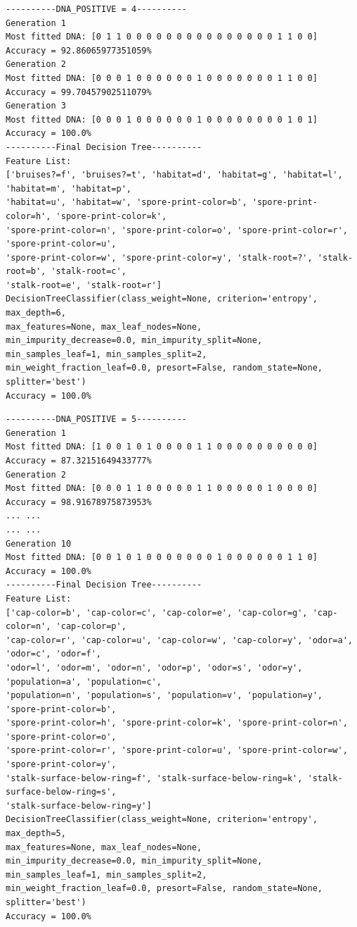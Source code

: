 \documentclass[runningheads]{llncs}
\begin{document}
\begin{verbatim}
----------DNA_POSITIVE = 4----------
Generation 1
Most fitted DNA: [0 1 1 0 0 0 0 0 0 0 0 0 0 0 0 0 0 0 1 1 0 0]
Accuracy = 92.86065977351059%
Generation 2
Most fitted DNA: [0 0 0 1 0 0 0 0 0 0 1 0 0 0 0 0 0 0 1 1 0 0]
Accuracy = 99.70457902511079%
Generation 3
Most fitted DNA: [0 0 0 1 0 0 0 0 0 0 1 0 0 0 0 0 0 0 0 1 0 1]
Accuracy = 100.0%
----------Final Decision Tree----------
Feature List:
['bruises?=f', 'bruises?=t', 'habitat=d', 'habitat=g', 'habitat=l', 'habitat=m', 'habitat=p',
'habitat=u', 'habitat=w', 'spore-print-color=b', 'spore-print-color=h', 'spore-print-color=k',
'spore-print-color=n', 'spore-print-color=o', 'spore-print-color=r', 'spore-print-color=u',
'spore-print-color=w', 'spore-print-color=y', 'stalk-root=?', 'stalk-root=b', 'stalk-root=c',
'stalk-root=e', 'stalk-root=r']
DecisionTreeClassifier(class_weight=None, criterion='entropy', max_depth=6,
max_features=None, max_leaf_nodes=None,
min_impurity_decrease=0.0, min_impurity_split=None,
min_samples_leaf=1, min_samples_split=2,
min_weight_fraction_leaf=0.0, presort=False, random_state=None,
splitter='best')
Accuracy = 100.0%
\end{verbatim}

\begin{verbatim}
----------DNA_POSITIVE = 5----------
Generation 1
Most fitted DNA: [1 0 0 1 0 1 0 0 0 0 1 1 0 0 0 0 0 0 0 0 0 0]
Accuracy = 87.32151649433777%
Generation 2
Most fitted DNA: [0 0 0 1 1 0 0 0 0 0 1 1 0 0 0 0 0 1 0 0 0 0]
Accuracy = 98.91678975873953%
... ...
... ...
Generation 10
Most fitted DNA: [0 0 1 0 1 0 0 0 0 0 0 0 1 0 0 0 0 0 0 1 1 0]
Accuracy = 100.0%
----------Final Decision Tree----------
Feature List:
['cap-color=b', 'cap-color=c', 'cap-color=e', 'cap-color=g', 'cap-color=n', 'cap-color=p',
'cap-color=r', 'cap-color=u', 'cap-color=w', 'cap-color=y', 'odor=a', 'odor=c', 'odor=f',
'odor=l', 'odor=m', 'odor=n', 'odor=p', 'odor=s', 'odor=y', 'population=a', 'population=c',
'population=n', 'population=s', 'population=v', 'population=y', 'spore-print-color=b',
'spore-print-color=h', 'spore-print-color=k', 'spore-print-color=n', 'spore-print-color=o',
'spore-print-color=r', 'spore-print-color=u', 'spore-print-color=w', 'spore-print-color=y',
'stalk-surface-below-ring=f', 'stalk-surface-below-ring=k', 'stalk-surface-below-ring=s',
'stalk-surface-below-ring=y']
DecisionTreeClassifier(class_weight=None, criterion='entropy', max_depth=5,
max_features=None, max_leaf_nodes=None,
min_impurity_decrease=0.0, min_impurity_split=None,
min_samples_leaf=1, min_samples_split=2,
min_weight_fraction_leaf=0.0, presort=False, random_state=None,
splitter='best')
Accuracy = 100.0%
\end{verbatim}
\end{document}
